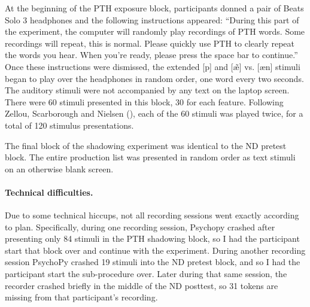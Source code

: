 At the beginning of the PTH exposure block, participants donned a pair of Beats Solo 3 headphones and the following instructions appeared: ``During this part of the experiment, the computer will randomly play recordings of PTH words. Some recordings will repeat, this is normal. Please quickly use PTH to clearly repeat the words you hear. When you're ready, please press the space bar to continue.'' Once these instructions were dismissed, the extended [p] and [\~{\ae}] vs. [\ae n] stimuli began to play over the headphones in random order, one word every two seconds. The auditory stimuli were not accompanied by any text on the laptop screen. There were 60 stimuli presented in this block, 30 for each feature. Following Zellou, Scarborough and Nielsen (\cite{zellou2016phonetic}), each of the 60 stimuli was played twice, for a total of 120 stimulus presentations. 


The final block of the shadowing experiment was identical to the ND pretest block. The entire production list was presented in random order as text stimuli on an otherwise blank screen.

\paragraph{Technical difficulties.}
\label{para:shadowingTechDiffs}
Due to some technical hiccups, not all recording sessions went exactly according to plan. Specifically,
during one recording session, Psychopy crashed after presenting only 84 stimuli in the PTH shadowing block, so I had the participant start that block over and continue with the experiment. %
During another recording session PsychoPy crashed 19 stimuli into the ND pretest block, and so I had the participant start the sub-procedure over. Later during that same session, the recorder crashed briefly in the middle of the ND posttest, so 31 tokens are missing from that participant's recording.

